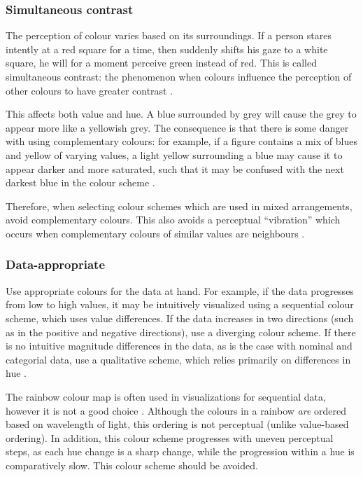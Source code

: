 \documentclass[letterpaper]{article}\usepackage[]{graphicx}\usepackage[]{color}
\begin{document}
\subsubsection{Simultaneous contrast}
The perception of colour varies based on its surroundings. If a person stares intently at a red square for a time, then suddenly shifts his gaze to a white square, he will for a moment perceive green instead of red. This is called simultaneous contrast: the phenomenon when colours influence the perception of other colours to have greater contrast \cite{albers}. 

This affects both value and hue. A blue surrounded by grey will cause the grey to appear more like a yellowish grey. The consequence is that there is some danger with using complementary colours: for example, if a figure contains a mix of blues and yellow of varying values, a light yellow surrounding a blue may cause it to appear darker and more saturated, such that it may be confused with the next darkest blue in the colour scheme \cite{brewers-sim}. 

Therefore, when selecting colour schemes which are used in mixed arrangements, avoid complementary colours. This also avoids a perceptual ``vibration'' which occurs when complementary colours of similar values are neighbours \cite{brewers-sim}.

\subsubsection{Data-appropriate}
Use appropriate colours for the data at hand. For example, if the data progresses from low to high values, it may be intuitively visualized using a sequential colour scheme, which uses value differences. If the data increases in two directions (such as in the positive and negative directions), use a diverging colour scheme. If there is no intuitive magnitude differences in the data, as is the case with nominal and categorial data, use a qualitative scheme, which relies primarily on differences in hue \cite{brewer-colour}.

The rainbow colour map is often used in visualizations for sequential data, however it is not a good choice \cite{rainbow}. Although the colours in a rainbow \textit{are} ordered based on wavelength of light, this ordering is not perceptual (unlike value-based ordering). In addition, this colour scheme progresses with uneven perceptual steps, as each hue change is a sharp change, while the progression within a hue is comparatively slow. This colour scheme should be avoided.
\end{document}
